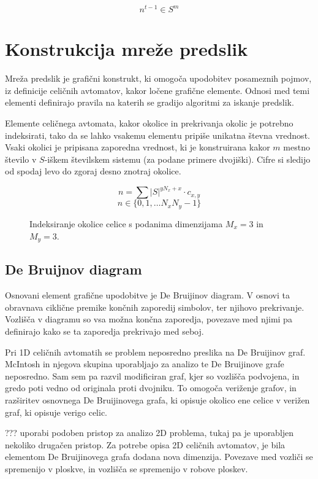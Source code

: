 \documentclass[12pt,a4paper,openany]{book}
\begin{document}
\[ n^{t-1} \in S^m \]

\chapter{Konstrukcija mreže predslik}

Mreža predslik je grafični konstrukt, ki omogoča upodobitev posameznih pojmov,
iz definicije celičnih avtomatov, kakor ločene grafične elemente. Odnosi med
temi elementi definirajo pravila na katerih se gradijo algoritmi za iskanje
predslik.

Elemente celičnega avtomata, kakor okolice in prekrivanja okolic je potrebno indeksirati,
tako da se lahko vsakemu elementu pripiše unikatna števna vrednost.
Vsaki okolici je pripisana zaporedna vrednost, ki je konstruirana kakor \(m\) mestno število
v \(S\)-iškem številskem sistemu (za podane primere dvojiški).
Cifre si sledijo od spodaj levo do zgoraj desno znotraj okolice.

\[ n = \sum |S|^{y N_x + x} \cdot c_{x,y} \]
\[ n \in \{0, 1, \dots N_x N_y -1\} \]

\begin{figure}[htb]
\centerline{}
\caption[Okolica.]{Indeksiranje okolice celice s podanima dimenzijama \(M_x=3\) in \(M_y=3\).}
\label{neighborhood_index}
\end{figure}

\section{De Bruijnov diagram}

Osnovani element grafične upodobitve je De Bruijinov diagram. V osnovi ta obravnava
ciklične premike končnih zaporedij simbolov, ter njihovo prekrivanje. Vozlišča v
diagramu so vsa možna končna zaporedja, povezave med njimi pa definirajo kako se
ta zaporedja prekrivajo med seboj.

Pri 1D celičnih avtomatih se problem neposredno preslika na De Bruijinov graf. McIntosh
in njegova skupina uporabljajo za analizo te De Bruijinove grafe neposredno. Sam sem pa
razvil modificiran graf, kjer so vozlišča podvojena, in gredo poti vedno od originala
proti dvojniku. To omogoča veriženje grafov, in razširitev osnovnega De Bruijinovega
grafa, ki opisuje okolico ene celice v verižen graf, ki opisuje verigo celic.

??? \cite{} uporabi podoben pristop za analizo 2D problema, tukaj pa je uporabljen nekoliko
drugačen pristop. Za potrebe opisa 2D celičnih avtomatov, je bila elementom
De Bruijinovega grafa dodana nova dimenzija. Povezave med vozliči se spremenijo
v ploskve, in vozlišča se spremenijo v robove ploskev.
\end{document}
